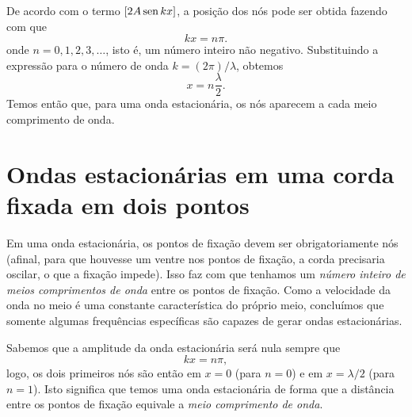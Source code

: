 De acordo com o termo $[2A\operatorname{sen} kx]$, a posição dos nós pode ser obtida fazendo com que
\begin{equation}
	kx = n\pi.
\end{equation}
%
onde $n = 0, 1, 2, 3, \dots$, isto é, um número inteiro não negativo. Substituindo a expressão para o número de onda $k = (2\pi)/\lambda$, obtemos
\begin{equation}
	x = n \frac{\lambda}{2}.
\end{equation}
%
Temos então que, para uma onda estacionária, os nós aparecem a cada meio comprimento de onda.

\section{Ondas estacionárias em uma corda fixada em dois pontos}

Em uma onda estacionária, os pontos de fixação devem ser obrigatoriamente nós (afinal, para que houvesse um ventre nos pontos de fixação, a corda precisaria oscilar, o que a fixação impede). Isso faz com que tenhamos um \emph{número inteiro de meios comprimentos de onda} entre os pontos de fixação. Como a velocidade da onda no meio é uma constante característica do próprio meio, concluímos que somente algumas frequências específicas são capazes de gerar ondas estacionárias.

Sabemos que a amplitude da onda estacionária será nula sempre que
\begin{equation}
	kx = n\pi,
\end{equation}
%
logo, os dois primeiros nós são então em $x=0$ (para $n = 0$) e em $x = \lambda/2$ (para $n = 1$). Isto significa que temos uma onda estacionária de forma que a distância entre os pontos de fixação equivale a \emph{meio comprimento de onda}.

